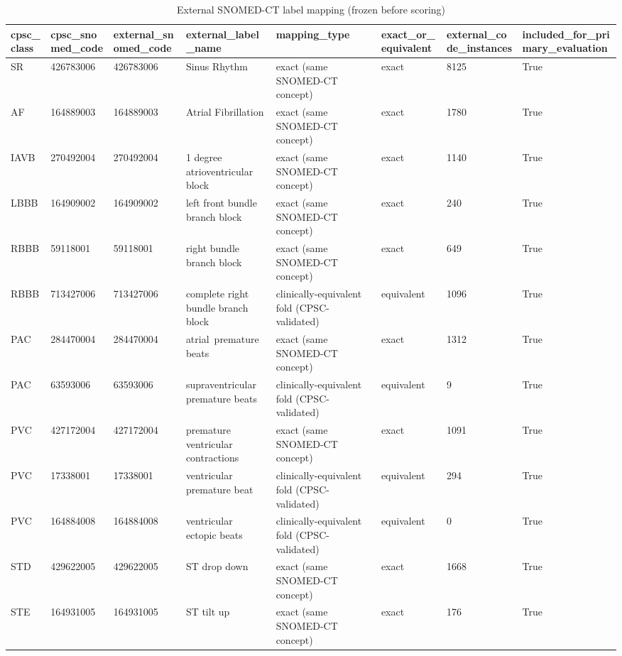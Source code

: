 \begin{table}[htbp]\centering\small
\caption{External SNOMED-CT label mapping (frozen before scoring)}\label{tab:extmapping}
\begin{tabular}{llllllll}
\hline
cpsc_class & cpsc_snomed_code & external_snomed_code & external_label_name & mapping_type & exact_or_equivalent & external_code_instances & included_for_primary_evaluation \\
\hline
SR & 426783006 & 426783006 & Sinus Rhythm & exact (same SNOMED-CT concept) & exact & 8125 & True \\
AF & 164889003 & 164889003 & Atrial Fibrillation & exact (same SNOMED-CT concept) & exact & 1780 & True \\
IAVB & 270492004 & 270492004 & 1 degree atrioventricular block & exact (same SNOMED-CT concept) & exact & 1140 & True \\
LBBB & 164909002 & 164909002 & left front bundle branch block & exact (same SNOMED-CT concept) & exact & 240 & True \\
RBBB & 59118001 & 59118001 & right bundle branch block & exact (same SNOMED-CT concept) & exact & 649 & True \\
RBBB & 713427006 & 713427006 & complete right bundle branch block & clinically-equivalent fold (CPSC-validated) & equivalent & 1096 & True \\
PAC & 284470004 & 284470004 & atrial premature beats & exact (same SNOMED-CT concept) & exact & 1312 & True \\
PAC & 63593006 & 63593006 & supraventricular premature beats & clinically-equivalent fold (CPSC-validated) & equivalent & 9 & True \\
PVC & 427172004 & 427172004 & premature ventricular contractions & exact (same SNOMED-CT concept) & exact & 1091 & True \\
PVC & 17338001 & 17338001 & ventricular premature beat & clinically-equivalent fold (CPSC-validated) & equivalent & 294 & True \\
PVC & 164884008 & 164884008 & ventricular ectopic beats & clinically-equivalent fold (CPSC-validated) & equivalent & 0 & True \\
STD & 429622005 & 429622005 & ST drop down & exact (same SNOMED-CT concept) & exact & 1668 & True \\
STE & 164931005 & 164931005 & ST tilt up & exact (same SNOMED-CT concept) & exact & 176 & True \\
\hline
\end{tabular}
\end{table}
